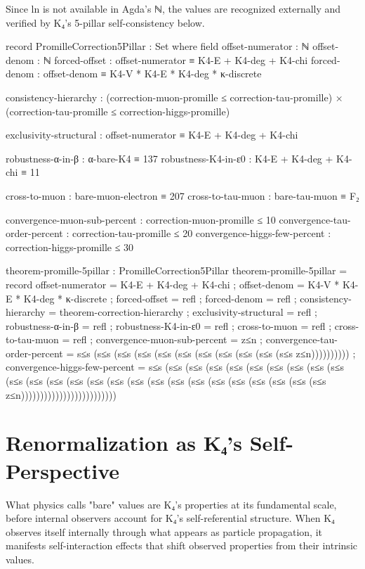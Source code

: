 \documentclass[11pt,a4paper]{book}
\begin{document}
Since ln is not available in Agda's ℕ, the values are recognized
externally and verified by K₄'s 5-pillar self-consistency below.

\begin{code}
record PromilleCorrection5Pillar : Set where
  field
    offset-numerator : ℕ
    offset-denom : ℕ
    forced-offset : offset-numerator ≡ K4-E + K4-deg + K4-chi
    forced-denom : offset-denom ≡ K4-V * K4-E * K4-deg * κ-discrete
    
    consistency-hierarchy : (correction-muon-promille ≤ correction-tau-promille) × 
                            (correction-tau-promille ≤ correction-higgs-promille)
    
    exclusivity-structural : offset-numerator ≡ K4-E + K4-deg + K4-chi
    
    robustness-α-in-β : α-bare-K4 ≡ 137
    robustness-K4-in-ε0 : K4-E + K4-deg + K4-chi ≡ 11
    
    cross-to-muon : bare-muon-electron ≡ 207
    cross-to-tau-muon : bare-tau-muon ≡ F₂
    
    convergence-muon-sub-percent : correction-muon-promille ≤ 10
    convergence-tau-order-percent : correction-tau-promille ≤ 20
    convergence-higgs-few-percent : correction-higgs-promille ≤ 30

theorem-promille-5pillar : PromilleCorrection5Pillar
theorem-promille-5pillar = record
  { offset-numerator = K4-E + K4-deg + K4-chi
  ; offset-denom = K4-V * K4-E * K4-deg * κ-discrete
  ; forced-offset = refl
  ; forced-denom = refl
  ; consistency-hierarchy = theorem-correction-hierarchy
  ; exclusivity-structural = refl
  ; robustness-α-in-β = refl
  ; robustness-K4-in-ε0 = refl
  ; cross-to-muon = refl
  ; cross-to-tau-muon = refl
  ; convergence-muon-sub-percent = z≤n
  ; convergence-tau-order-percent = s≤s (s≤s (s≤s (s≤s (s≤s (s≤s (s≤s (s≤s (s≤s (s≤s (s≤s z≤n))))))))))
  ; convergence-higgs-few-percent = s≤s (s≤s (s≤s (s≤s (s≤s (s≤s (s≤s (s≤s (s≤s (s≤s (s≤s (s≤s (s≤s (s≤s (s≤s (s≤s (s≤s (s≤s (s≤s (s≤s (s≤s (s≤s (s≤s (s≤s (s≤s (s≤s z≤n)))))))))))))))))))))))))
  }

\end{code}

\section{Renormalization as K₄'s Self-Perspective}

What physics calls "bare" values are K₄'s properties at its fundamental scale, before internal observers account for K₄'s self-referential structure. When K₄ observes itself internally through what appears as particle propagation, it manifests self-interaction effects that shift observed properties from their intrinsic values.
\end{document}
